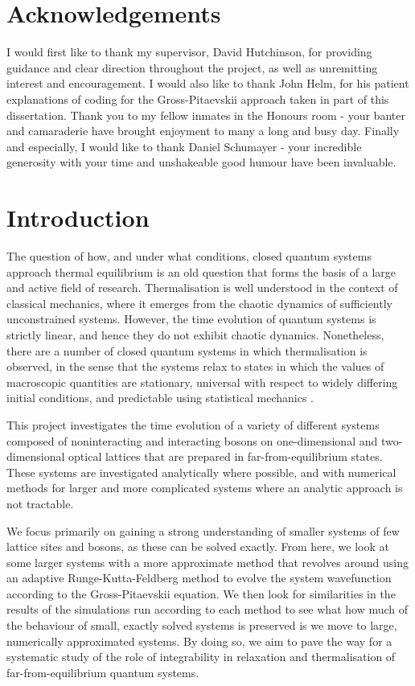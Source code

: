 \documentclass[a4paper, 10pt]{article}
\theoremstyle{plain}
\begin{document}
\section*{Acknowledgements}
\thispagestyle{plain}
I would first like to thank my supervisor, David Hutchinson, for providing 
guidance and clear direction throughout the project, as well as unremitting
interest and encouragement. I would also like to thank John Helm, for 
his patient explanations of coding for the Gross-Pitaevskii approach taken 
in part of this dissertation. Thank you to my fellow inmates in the Honours 
room - your banter and camaraderie have brought enjoyment to many a long and 
busy day. Finally and especially, I would like to thank Daniel Schumayer -
your incredible generosity with your time and unshakeable good humour have been
invaluable.
\newpage
\tableofcontents
\newpage
{}
\section*{Introduction}
The question of how, and under what conditions, closed quantum systems approach
thermal equilibrium is an old question that forms the basis of a large and
active field of research. Thermalisation is well understood in the context
of classical mechanics, where it emerges from the chaotic
dynamics of sufficiently unconstrained systems. However, the time evolution of
quantum systems is strictly linear, and hence they do not exhibit chaotic
dynamics. Nonetheless, there are a number of closed quantum systems in which
thermalisation is observed, in the sense that the systems relax to states in
which the values of macroscopic quantities are stationary, universal with
respect to widely differing initial conditions, and predictable using
statistical mechanics \cite{Rigol2008}.

This project investigates the time evolution of a variety of different systems
composed of noninteracting and interacting bosons on one-dimensional and
two-dimensional optical lattices that are prepared in far-from-equilibrium
states. These systems are investigated analytically where possible, and with
numerical methods for larger and more complicated systems where an analytic
approach is not tractable. 

We focus primarily on gaining a strong
understanding of smaller systems of few lattice sites and bosons, as these
can be solved exactly. From here, we look at some larger systems with a more
approximate method that revolves around using an adaptive Runge-Kutta-Feldberg
method to evolve the system wavefunction according to the Gross-Pitaevskii
equation. We then look for similarities in the results of the simulations run
according to each method to see what how much of the behaviour of small,
exactly solved systems is preserved is we move to large, numerically approximated
systems. By doing so, we aim to pave the way for a systematic study of the role
of integrability in relaxation and thermalisation of far-from-equilibrium
quantum systems.
\newpage
\end{document}
